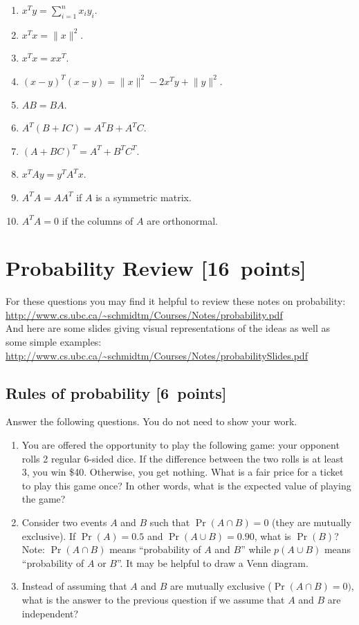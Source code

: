 \documentclass{article}
\newcommand{\blu}[1]{{\textcolor{blu}{#1}}}
\let\ask\blu
\newcommand\pts[1]{\textcolor{pointscolour}{[#1~points]}}
\newcommand{\norm}[1]{\lVert #1 \rVert}
\begin{document}
  \begin{enumerate}
  \item $x^Ty = \sum_{i=1}^n x_iy_i$.
  \item $x^Tx = \norm{x}^2$.
  \item $x^Tx = xx^T$.
  \item $(x-y)^T(x-y) = \norm{x}^2 - 2x^Ty + \norm{y}^2$.
  \item $AB=BA$.
  \item $A^T(B + IC) = A^TB + A^TC$.
  \item $(A + BC)^T = A^T + B^TC^T$.
  \item $x^TAy = y^TA^Tx$.
  \item $A^TA = AA^T$ if $A$ is a symmetric matrix.
  \item $A^TA = 0$ if the columns of $A$ are orthonormal.
  \end{enumerate}


  \clearpage\section{Probability Review \pts{16}}


  For these questions you may find it helpful to review these notes on probability:\\
  \url{http://www.cs.ubc.ca/~schmidtm/Courses/Notes/probability.pdf}\\
  And here are some slides giving visual representations of the ideas as well as some simple examples:\\
  \url{http://www.cs.ubc.ca/~schmidtm/Courses/Notes/probabilitySlides.pdf}

  \subsection{Rules of probability \pts{6}}

  \ask{Answer the following questions.} You do not need to show your work.


  \begin{enumerate}
  \item You are offered the opportunity to play the following game: your opponent rolls 2 regular 6-sided dice. If the difference between the two rolls is at least 3, you win \$40. Otherwise, you get nothing. What is a fair price for a ticket to play this game once? In other words, what is the expected value of playing the game?
  \item Consider two events $A$ and $B$ such that $\Pr(A \cap B)=0$ (they are mutually exclusive). If $\Pr(A) = 0.5$ and $\Pr(A \cup B) = 0.90$, what is $\Pr(B)$? Note: $\Pr(A \cap B)$ means
  ``probability of $A$ and $B$'' while $p(A \cup B)$ means ``probability of $A$ or $B$''. It may be helpful to draw a Venn diagram.
  \item Instead of assuming that $A$ and $B$ are mutually exclusive ($\Pr(A \cap B) = 0)$, what is the answer to the previous question if we assume that $A$ and $B$ are independent?


  \end{enumerate}
\end{document}
